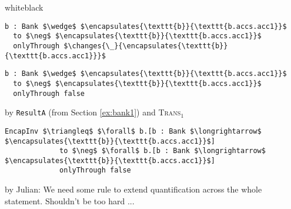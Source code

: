 \documentclass[acmsmall,review,anonymous]{acmart}\settopmatter{printfolios=true,printccs=false,printacmref=false}
\begin{document}
\begin{proofBox}{white}{black}
\footnotesize
\begin{minipage}{0.75\textwidth}
\begin{lstlisting}[language = Chainmail, mathescape=true, frame=single]
b : Bank $\wedge$ $\encapsulates{\texttt{b}}{\texttt{b.accs.acc1}}$
  to $\neg$ $\encapsulates{\texttt{b}}{\texttt{b.accs.acc1}}$
  onlyThrough $\changes{\_}{\encapsulates{\texttt{b}}{\texttt{b.accs.acc1}}}$
\end{lstlisting}
\end{minipage}
\begin{minipage}{0.24\textwidth}
\end{minipage}
\begin{minipage}{0.75\textwidth}
\begin{lstlisting}[language = Chainmail, mathescape=true]
b : Bank $\wedge$ $\encapsulates{\texttt{b}}{\texttt{b.accs.acc1}}$
  to $\neg$ $\encapsulates{\texttt{b}}{\texttt{b.accs.acc1}}$
  onlyThrough false
\end{lstlisting}
\end{minipage}
\begin{minipage}{0.24\textwidth}
\scriptsize
\hfill by \texttt{ResultA} (from Section \ref{ex:bank1}) and \textsc{Trans}$_1$
\end{minipage}
\begin{minipage}{0.75\textwidth}
\begin{lstlisting}[language = Chainmail, mathescape=true]
EncapInv $\triangleq$ $\forall$ b.[b : Bank $\longrightarrow$ $\encapsulates{\texttt{b}}{\texttt{b.accs.acc1}}$]
             to $\neg$ $\forall$ b.[b : Bank $\longrightarrow$ $\encapsulates{\texttt{b}}{\texttt{b.accs.acc1}}$]
             onlyThrough false
\end{lstlisting}
\end{minipage}
\begin{minipage}{0.24\textwidth}
\scriptsize
\hfill by {\color{red}Julian: We need some rule to extend quantification across the whole statement. Shouldn't be too hard ...}
\end{minipage}
\end{proofBox}
\end{document}
